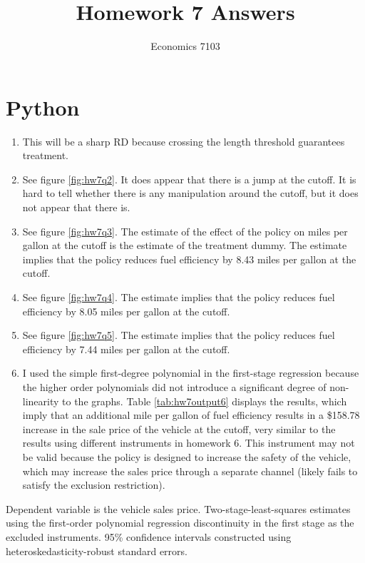 \documentclass{article}
\title{Homework 7 Answers}
\author{Economics 7103}
\date{ }
\begin{document}
  
\maketitle

\section{Python}

\begin{enumerate}
    \item This will be a sharp RD because crossing the length threshold guarantees treatment. 
    \item See figure \ref{fig:hw7q2}.  It does appear that there is a jump at the cutoff.  It is hard to tell whether there is any manipulation around the cutoff, but it does not appear that there is.
    \item See figure \ref{fig:hw7q3}.  The estimate of the effect of the policy on miles per gallon at the cutoff is the estimate of the treatment dummy.  The estimate implies that the policy reduces fuel efficiency by 8.43 miles per gallon at the cutoff.
    \item See figure \ref{fig:hw7q4}.  The estimate implies that the policy reduces fuel efficiency by 8.05 miles per gallon at the cutoff.
    \item See figure \ref{fig:hw7q5}.  The estimate implies that the policy reduces fuel efficiency by 7.44 miles per gallon at the cutoff.
    \item I used the simple first-degree polynomial in the first-stage regression because the higher order polynomials did not introduce a significant degree of non-linearity to the graphs.  Table \ref{tab:hw7output6} displays the results, which imply that an additional mile per gallon of fuel efficiency results in a \$158.78 increase in the sale price of the vehicle at the cutoff, very similar to the results using different instruments in homework 6.  This instrument may not be valid because the policy is designed to increase the safety of the vehicle, which may increase the sales price through a separate channel (likely fails to satisfy the exclusion restriction).
\end{enumerate}

\begin{table}[ht]
    \centering
   
    \caption{Dependent variable is the vehicle sales price. Two-stage-least-squares estimates using the first-order polynomial regression discontinuity in the first stage as the excluded instruments.  95\% confidence intervals constructed using heteroskedasticity-robust standard errors.}
    \label{tab:hw7output6}
\end{table}
\end{document}
